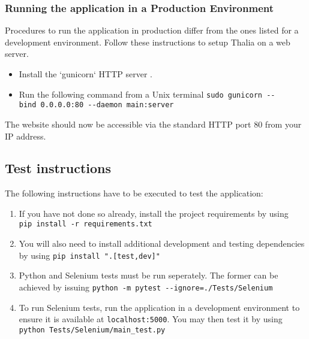 \documentclass[main.tex]{subfiles}
\begin{document}
\subsubsection{Running the application in a Production
Environment}
\label{run-in-a-production-environemnt}

Procedures to run the application in production differ from the ones listed for a development environment. Follow these instructions to setup Thalia on a web server.

\begin{itemize}
\item
  Install the `gunicorn` HTTP server \cite{Gunicorn}.
\item
  Run the following command from a Unix terminal 
  \newline
  \texttt{sudo\ gunicorn\ -\/-bind\ 0.0.0.0:80\ -\/-daemon\ main:server}
\end{itemize}
The website should now be accessible via the standard HTTP port 80 from your IP address.

\subsection{Test instructions}
\label{test-instructions}

The following instructions have to be executed to test the application:

\begin{enumerate}
 \item If you have not done so already, install the project requirements by using
 \newline
 \texttt{pip\ install\ -r\ requirements.txt}
 
 \item You will also need to install additional development and testing dependencies by using
 \newline
 \texttt{pip\ install\ ".{[}test,dev{]}"}
  
  \item Python and Selenium tests must be run seperately. The former can be achieved by issuing
  \newline
  \texttt{python\ -m\ pytest\ -\/-ignore=./Tests/Selenium}
  
  \item To run Selenium tests, run the application in a development environment to ensure it is available at \texttt{localhost:5000}. You may then test it by using
  \newline
  \texttt{python\ Tests/Selenium/main\_test.py}
\end{enumerate}
\end{document}
